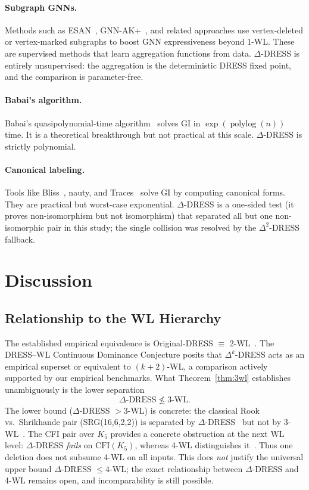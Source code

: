 \documentclass[11pt,a4paper]{article}
\begin{document}
\paragraph{Subgraph GNNs.}
Methods such as ESAN~\cite{bevilacqua2022equivariant}, GNN-AK+~\cite{zhao2022from}, and related approaches use vertex-deleted or vertex-marked subgraphs to boost GNN expressiveness beyond 1-WL.
These are supervised methods that learn aggregation functions from data.
$\Delta$-DRESS is entirely unsupervised: the aggregation is the deterministic DRESS fixed point, and the comparison is parameter-free.

\paragraph{Babai's algorithm.}
Babai's quasipolynomial-time algorithm~\cite{babai2016graph} solves GI in $\exp(\operatorname{polylog}(n))$ time.
It is a theoretical breakthrough but not practical at this scale.
$\Delta$-DRESS is strictly polynomial.

\paragraph{Canonical labeling.}
Tools like Bliss~\cite{junttila2007bliss}, nauty, and Traces~\cite{mckay2014practical} solve GI by computing canonical forms.
They are practical but worst-case exponential.
$\Delta$-DRESS is a one-sided test (it proves non-isomorphism but not isomorphism) that separated all but one non-isomorphic pair in this study; the single collision was resolved by the $\Delta^2$-DRESS fallback.


\section{Discussion}

\subsection{Relationship to the WL Hierarchy}

The established empirical equivalence is Original-DRESS $\equiv$ 2-WL~\cite{castrillo2026dress}.
The DRESS--WL Continuous Dominance Conjecture posits that $\Delta^k$-DRESS acts as an empirical superset or equivalent to $(k{+}2)$-WL, a comparison actively supported by our empirical benchmarks.
What Theorem~\ref{thm:3wl} establishes unambiguously is the lower separation
\[
\Delta\text{-DRESS} \not\le 3\text{-WL}.
\]
The lower bound ($\Delta$-DRESS $> 3$-WL) is concrete: the classical Rook vs.\ Shrikhande pair (SRG(16,6,2,2)) is separated by $\Delta$-DRESS~\cite{castrillo2026dress} but not by 3-WL~\cite{cai1992optimal}.
The CFI pair over $K_5$ provides a concrete obstruction at the next WL level: $\Delta$-DRESS \emph{fails} on $\text{CFI}(K_5)$, whereas 4-WL distinguishes it~\cite{cai1992optimal, castrillo2026dress}.
Thus one deletion does not subsume 4-WL on all inputs.  This does \emph{not} justify the universal upper bound $\Delta$-DRESS $\leq 4$-WL; the exact relationship between $\Delta$-DRESS and 4-WL remains open, and incomparability is still possible.
\end{document}
